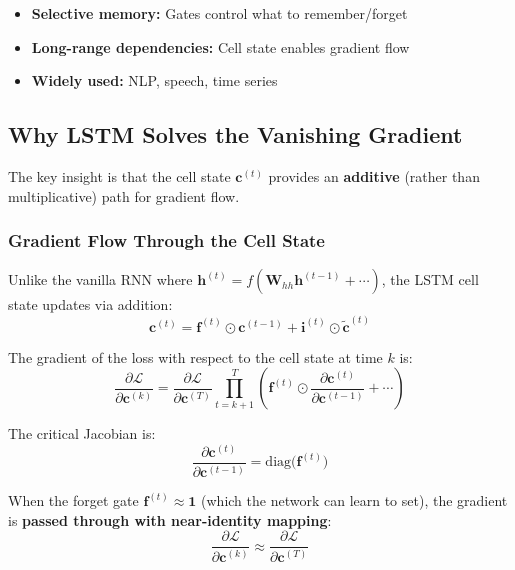 \begin{properties}
\begin{itemize}
    \item \textbf{Selective memory:} Gates control what to remember/forget
    \item \textbf{Long-range dependencies:} Cell state enables gradient flow
    \item \textbf{Widely used:} NLP, speech, time series
\end{itemize}
\end{properties}

\subsection{Why LSTM Solves the Vanishing Gradient}

The key insight is that the cell state $\mathbf{c}^{(t)}$ provides an \textbf{additive} (rather than multiplicative) path for gradient flow.

\subsubsection{Gradient Flow Through the Cell State}

Unlike the vanilla RNN where $\mathbf{h}^{(t)} = f(\mathbf{W}_{hh}\mathbf{h}^{(t-1)} + \cdots)$, the LSTM cell state updates via addition:
\begin{equation}
\mathbf{c}^{(t)} = \mathbf{f}^{(t)} \odot \mathbf{c}^{(t-1)} + \mathbf{i}^{(t)} \odot \tilde{\mathbf{c}}^{(t)}
\end{equation}

The gradient of the loss with respect to the cell state at time $k$ is:
\begin{equation}
\frac{\partial \mathcal{L}}{\partial \mathbf{c}^{(k)}} = \frac{\partial \mathcal{L}}{\partial \mathbf{c}^{(T)}} \prod_{t=k+1}^{T} \left( \mathbf{f}^{(t)} \odot \frac{\partial \mathbf{c}^{(t)}}{\partial \mathbf{c}^{(t-1)}} + \cdots \right)
\end{equation}

The critical Jacobian is:
\begin{equation}
\frac{\partial \mathbf{c}^{(t)}}{\partial \mathbf{c}^{(t-1)}} = \text{diag}\bigl(\mathbf{f}^{(t)}\bigr)
\end{equation}

When the forget gate $\mathbf{f}^{(t)} \approx \mathbf{1}$ (which the network can learn to set), the gradient is \textbf{passed through with near-identity mapping}:
\begin{equation}
\frac{\partial \mathcal{L}}{\partial \mathbf{c}^{(k)}} \approx \frac{\partial \mathcal{L}}{\partial \mathbf{c}^{(T)}}
\end{equation}

